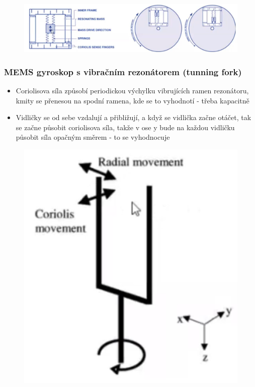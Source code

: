 \begin{figure}[h]
    \centering
    \includegraphics[scale = 0.40]{img/coriool123.png}
\end{figure}

\subsubsection*{MEMS gyroskop s vibračním rezonátorem (tunning fork)}
\begin{itemize}
    \item Coriolisova síla způsobí periodickou výchylku vibrujících ramen rezonátoru, kmity se přenesou na spodní ramena, kde se to vyhodnotí - třeba kapacitně
    \item Vidličky se od sebe vzdalují a přibližují, a když se vidlička začne otáčet, tak se začne působit coriolisova síla, takže v ose y bude na každou vidličku působit síla opačným směrem - to se vyhodnocuje
\end{itemize}

\begin{figure}[h]
    \centering
    \includegraphics[scale = 0.40]{img/vidlicka.png}
\end{figure}

